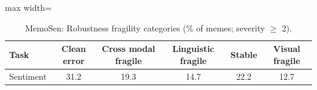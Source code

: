 \begin{table}[t]
\centering
\small
\caption{MemoSen: Robustness fragility categories (\% of memes; severity $\geq$ 2).}
\label{tab:fragility_table_memosen}
\begin{adjustbox}{max width=\columnwidth}
\begin{tabular}{lccccc}
\toprule
Task & Clean error & Cross modal fragile & Linguistic fragile & Stable & Visual fragile \\
\midrule
Sentiment & 31.2 & 19.3 & 14.7 & 22.2 & 12.7 \\
\bottomrule
\end{tabular}
\end{adjustbox}
\end{table}
